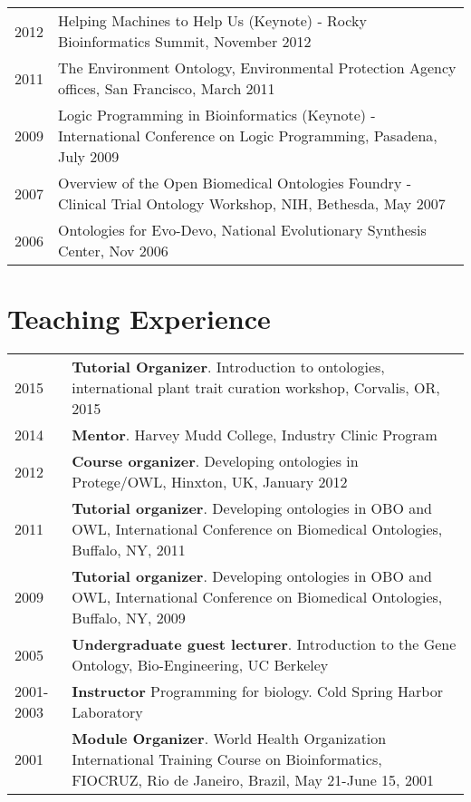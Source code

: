 \documentclass[11pt,fullpage]{article}
\begin{document}
\begin{longtable}{p{0.5in}|p{5.5in}}
 2012 & Helping Machines to Help Us (Keynote) - Rocky Bioinformatics
 Summit, November 2012\\

 2011 & The Environment Ontology, Environmental Protection Agency offices, San Francisco, March 2011 \\

 2009 & Logic Programming in Bioinformatics (Keynote) - International
 Conference on Logic Programming, Pasadena, July 2009 \\

 2007 & Overview of the Open Biomedical Ontologies Foundry - Clinical Trial Ontology Workshop, NIH, Bethesda, May 2007 \\

 2006 & Ontologies for Evo-Devo, National Evolutionary Synthesis Center, Nov 2006 \\


\end{longtable}




\section*{Teaching Experience}

\begin{longtable}{p{0.5in}|p{5.5in}}
  2015 &  \textbf{Tutorial Organizer}. Introduction to ontologies, international plant trait curation workshop, Corvalis, OR, 2015  \\
  2014 &  \textbf{Mentor}. Harvey Mudd College, Industry Clinic Program \\
  2012 &  \textbf{Course organizer}. Developing ontologies in Protege/OWL, Hinxton, UK, January 2012 \\
  2011 &  \textbf{Tutorial organizer}. Developing ontologies in OBO and OWL, International Conference on Biomedical Ontologies, Buffalo, NY, 2011 \\
  2009 &  \textbf{Tutorial organizer}. Developing ontologies in OBO and OWL, International Conference on Biomedical Ontologies, Buffalo, NY, 2009 \\
  2005 &  \textbf{Undergraduate guest lecturer}. Introduction to the Gene Ontology, Bio-Engineering, UC Berkeley \\
  2001-2003 &  \textbf{Instructor} Programming for biology. Cold Spring Harbor Laboratory\\
  2001 &  \textbf{Module Organizer}. World Health Organization International Training Course on Bioinformatics, FIOCRUZ, Rio de Janeiro, Brazil, May 21-June 15, 2001 \\
\end{longtable}
\end{document}
